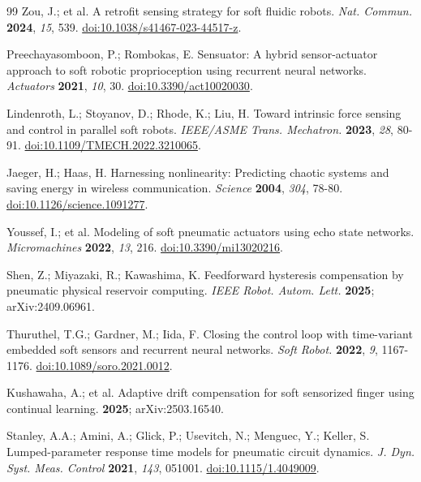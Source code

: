 \documentclass[preprints,article,submit,oneauthor]{Definitions/mdpi}
\begin{document}
\begin{thebibliography}{99}
Zou, J.; et al. A retrofit sensing strategy for soft fluidic robots. \emph{Nat. Commun.} \textbf{2024}, \emph{15}, 539. \href{https://doi.org/10.1038/s41467-023-44517-z}{doi:10.1038/s41467-023-44517-z}.

Preechayasomboon, P.; Rombokas, E. Sensuator: A hybrid sensor-actuator approach to soft robotic proprioception using recurrent neural networks. \emph{Actuators} \textbf{2021}, \emph{10}, 30. \href{https://doi.org/10.3390/act10020030}{doi:10.3390/act10020030}.

Lindenroth, L.; Stoyanov, D.; Rhode, K.; Liu, H. Toward intrinsic force sensing and control in parallel soft robots. \emph{IEEE/ASME Trans. Mechatron.} \textbf{2023}, \emph{28}, 80-91. \href{https://doi.org/10.1109/TMECH.2022.3210065}{doi:10.1109/TMECH.2022.3210065}.

Jaeger, H.; Haas, H. Harnessing nonlinearity: Predicting chaotic systems and saving energy in wireless communication. \emph{Science} \textbf{2004}, \emph{304}, 78-80. \href{https://doi.org/10.1126/science.1091277}{doi:10.1126/science.1091277}.

Youssef, I.; et al. Modeling of soft pneumatic actuators using echo state networks. \emph{Micromachines} \textbf{2022}, \emph{13}, 216. \href{https://doi.org/10.3390/mi13020216}{doi:10.3390/mi13020216}.

Shen, Z.; Miyazaki, R.; Kawashima, K. Feedforward hysteresis compensation by pneumatic physical reservoir computing. \emph{IEEE Robot. Autom. Lett.} \textbf{2025}; arXiv:2409.06961.

Thuruthel, T.G.; Gardner, M.; Iida, F. Closing the control loop with time-variant embedded soft sensors and recurrent neural networks. \emph{Soft Robot.} \textbf{2022}, \emph{9}, 1167-1176. \href{https://doi.org/10.1089/soro.2021.0012}{doi:10.1089/soro.2021.0012}.

Kushawaha, A.; et al. Adaptive drift compensation for soft sensorized finger using continual learning. \textbf{2025}; arXiv:2503.16540.

Stanley, A.A.; Amini, A.; Glick, P.; Usevitch, N.; Menguec, Y.; Keller, S. Lumped-parameter response time models for pneumatic circuit dynamics. \emph{J. Dyn. Syst. Meas. Control} \textbf{2021}, \emph{143}, 051001. \href{https://doi.org/10.1115/1.4049009}{doi:10.1115/1.4049009}.


\end{thebibliography}
\end{document}
